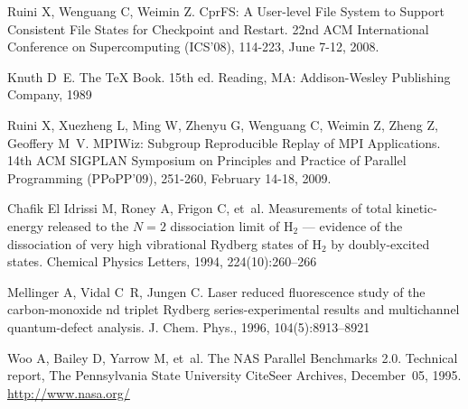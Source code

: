 \documentclass{ics}
\begin{document}
\begin{thebibliography}{99}

 Ruini X, Wenguang C, Weimin Z. CprFS: A User-level File System
  to Support Consistent File States for Checkpoint and Restart. 22nd ACM
  International Conference on Supercomputing (ICS'08), 114-223, June 7-12, 2008.

 Knuth D~E. The {\TeX} Book. 15th ed. Reading, MA: Addison-Wesley
  Publishing Company, 1989

 Ruini X, Xuezheng L, Ming W, Zhenyu G, Wenguang C, Weimin Z,
  Zheng Z, Geoffery M~V. MPIWiz: Subgroup Reproducible Replay of MPI
  Applications. 14th ACM SIGPLAN Symposium on Principles and Practice of
  Parallel Programming (PPoPP'09), 251-260, February 14-18, 2009.

 {Chafik El Idrissi} M, Roney A, Frigon C, et~al. Measurements
  of total kinetic-energy released to the {$N=2$} dissociation limit of {H}$_2$
  --- evidence of the dissociation of very high vibrational {R}ydberg states of
  {H}$_2$ by doubly-excited states. Chemical Physics Letters, 1994,
  224(10):260--266

 Mellinger A, Vidal C~R, Jungen C.  Laser reduced
  fluorescence study of the carbon-monoxide nd triplet {R}ydberg
  series-experimental results and multichannel quantum-defect analysis.
  J. Chem. Phys., 1996, 104(5):8913--8921

 Woo A, Bailey D, Yarrow M, et~al. The {NAS} Parallel Benchmarks
  2.0. Technical report, The Pennsylvania State University CiteSeer Archives,
  December~05, 1995. \url{http://www.nasa.org/}
\end{thebibliography}
\end{document}

